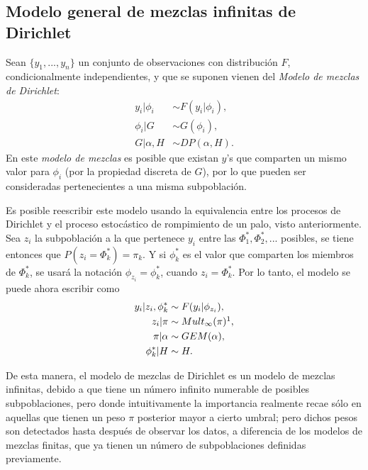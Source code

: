 \subsection{Modelo general de mezclas infinitas de Dirichlet}

Sean $\{y_1,...,y_n\}$ un conjunto de observaciones con distribuci\'on $F$, condicionalmente independientes, y que se suponen vienen del \textit{Modelo de mezclas de Dirichlet}:
\begin{equation*}
\begin{aligned}
   y_i | \phi_i &\sim F(y_i | \phi_i), \\
   \phi_i | G &\sim G(\phi_i), \\
   G | \alpha, H &\sim DP(\alpha,H).
\end{aligned}
\end{equation*}
En este \textit{modelo de mezclas} es posible que existan $y$'s que comparten un mismo valor para $\phi_i$ (por la propiedad discreta de $G$), por lo que pueden ser consideradas pertenecientes a una misma subpoblaci\'on.

Es posible reescribir este modelo usando la equivalencia entre los procesos de Dirichlet y el proceso estoc\'astico de rompimiento de un palo, visto anteriormente. Sea $z_i$ la subpoblaci\'on a la que pertenece $y_i$ entre las $\Phi_1^*,\Phi_2^*,...$ posibles, se tiene entonces que $P(z_i = \Phi_k^*) = \pi_k$. Y si $\phi_k^*$ es el valor que comparten los miembros de $\Phi_k^*$, se usar\'a la notaci\'on $\phi_{z_i} = \phi_k^*$, cuando $z_i = \Phi_k^*$. Por lo tanto, el modelo se puede ahora escribir como
\begin{equation*}
\begin{aligned}
   y_i | z_i, \phi_k^* &\sim F(y_i | \phi_{z_i}), \\
   z_i | \pi &\sim Mult_\infty(\pi)\footnotemark, \\
   \pi | \alpha &\sim GEM(\alpha), \\
   \phi_k^* | H &\sim H.
\end{aligned}
\end{equation*}

De esta manera, el modelo de mezclas de Dirichlet es un modelo de mezclas infinitas, debido a que tiene un n\'umero infinito numerable de posibles subpoblaciones, pero donde intuitivamente la importancia realmente recae s\'olo en aquellas que tienen un peso $\pi$ posterior mayor a cierto umbral; pero dichos pesos son detectados hasta despu\'es de observar los datos, a diferencia de los modelos de mezclas finitas, que ya tienen un n\'umero de subpoblaciones definidas previamente.

